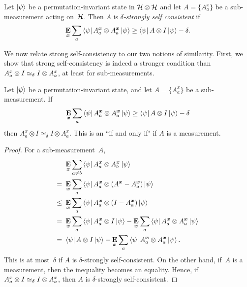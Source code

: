 \begin{definition}\label{def:strong-self-consistency}
Let $\ket{\psi}$ be a permutation-invariant state in $\mathcal{H} \otimes \mathcal{H}$
and let $A = \{A^x_a\}$ be a sub-measurement acting on~$\mathcal{H}$.
Then $A$ is \emph{$\delta$-strongly self consistent} if
\begin{equation*}
\mathop{\bf E\/}_{{\boldsymbol{x}}} \sum_a \bra{\psi} A^{{\boldsymbol{x}}}_a \otimes A^{{\boldsymbol{x}}}_a \ket{\psi}
\geq
\bra{\psi} A \otimes I \ket{\psi} -  \delta.
\end{equation*}
\end{definition}

We now relate strong self-consistency to our two notions of similarity.
First, we show that strong self-consistency is indeed
a stronger condition than $A^x_a \otimes I \simeq_{\delta} I \otimes A^x_a$,
at least for sub-measurements.

\begin{proposition}\label{prop:other-two-notions-of-self-consistency}
Let $\ket{\psi}$ be a permutation-invariant state,
and let $A = \{A^x_a\}$ be a sub-measurement. If
\begin{equation*}
\mathop{\bf E\/}_{{\boldsymbol{x}}} \sum_a \bra{\psi} A^{{\boldsymbol{x}}}_a \otimes A^{{\boldsymbol{x}}}_a \ket{\psi} \geq \bra{\psi} A \otimes I \ket{\psi} - \delta
\end{equation*}
then $A^x_a \otimes I \simeq_{\delta} I \otimes A^x_a$.
This is an ``if and only if" if $A$ is a measurement.
\end{proposition}
\begin{proof}
For a sub-measurement~$A$,
\begin{align*}
&\mathop{\bf E\/}_{{\boldsymbol{x}}} \sum_{a \neq b} \bra{\psi} A^{{\boldsymbol{x}}}_a \otimes A^{{\boldsymbol{x}}}_b \ket{\psi}\\
=~& \mathop{\bf E\/}_{{\boldsymbol{x}}} \sum_{a} \bra{\psi} A^{{\boldsymbol{x}}}_a \otimes (A^{{\boldsymbol{x}}}- A^{{\boldsymbol{x}}}_a) \ket{\psi}\\
\leq~&\mathop{\bf E\/}_{{\boldsymbol{x}}} \sum_{a} \bra{\psi} A^{{\boldsymbol{x}}}_a \otimes (I- A^{{\boldsymbol{x}}}_a) \ket{\psi}\\
=~&\mathop{\bf E\/}_{{\boldsymbol{x}}} \sum_{a} \bra{\psi} A^{{\boldsymbol{x}}}_a \otimes I \ket{\psi}
		- \mathop{\bf E\/}_{{\boldsymbol{x}}} \sum_{a} \bra{\psi} A^{{\boldsymbol{x}}}_a \otimes A^{{\boldsymbol{x}}}_a \ket{\psi}\\
=~& \bra{\psi} A \otimes I \ket{\psi}
		- \mathop{\bf E\/}_{{\boldsymbol{x}}} \sum_{a} \bra{\psi} A^{{\boldsymbol{x}}}_a \otimes A^{{\boldsymbol{x}}}_a \ket{\psi}.
\end{align*}
This is at most~$\delta$ if $A$ is $\delta$-strongly self-consistent.
On the other hand, if~$A$ is a measurement, then the inequality becomes an equality.
Hence, if $A^x_a \otimes I \simeq_{\delta} I \otimes A^x_a$,
then $A$ is $\delta$-strongly self-consistent.
\end{proof}

